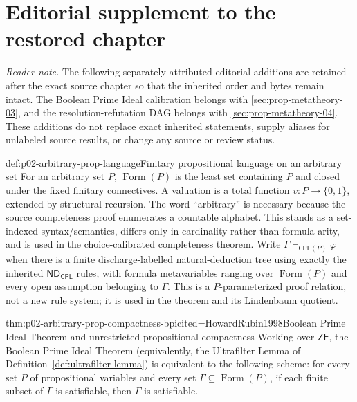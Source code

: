 \section*{Editorial supplement to the restored chapter}
\noindent\textit{Reader note.} The following separately attributed editorial
additions are retained after the exact source chapter so that the inherited
order and bytes remain intact.  The Boolean Prime Ideal calibration belongs
with \cref{sec:prop-metatheory-03}, and the resolution-refutation DAG belongs
with \cref{sec:prop-metatheory-04}.  These additions do not replace exact
inherited statements, supply aliases for unlabeled source results, or change
any source or review status.

\begin{hbdefinition}{def:p02-arbitrary-prop-language}{Finitary propositional language on an arbitrary set}
For an arbitrary set \(P\), \(\operatorname{Form}(P)\) is the least set
containing \(P\) and closed under the fixed finitary connectives. A valuation
is a total function \(v:P\to\{0,1\}\), extended by structural recursion. The
word ``arbitrary'' is necessary because the source completeness proof
enumerates a countable alphabet. This stands as a set-indexed syntax/semantics,
differs only in cardinality rather than formula arity, and is used in the
choice-calibrated completeness theorem.  Write
\(\Gamma\vdash_{\mathsf{CPL}(P)}\varphi\) when there is a finite
discharge-labelled natural-deduction tree using exactly the inherited
\(\mathsf{ND}_{\mathsf{CPL}}\) rules, with formula metavariables ranging over
\(\operatorname{Form}(P)\) and every open assumption belonging to \(\Gamma\).
This is a \(P\)-parameterized proof relation, not a new rule system; it is used
in the theorem and its Lindenbaum quotient.
\end{hbdefinition}

\begin{hbtheorem}{thm:p02-arbitrary-prop-compactness-bpi}{cited=HowardRubin1998}{Boolean Prime Ideal Theorem and unrestricted propositional compactness}
Working over \(\mathsf{ZF}\), the Boolean Prime Ideal Theorem (equivalently,
the Ultrafilter Lemma of Definition~\ref{def:ultrafilter-lemma}) is equivalent
to the following scheme: for every set \(P\) of propositional variables and
every set \(\Gamma\subseteq\operatorname{Form}(P)\), if each finite subset
of \(\Gamma\) is satisfiable, then \(\Gamma\) is satisfiable.
\end{hbtheorem}

